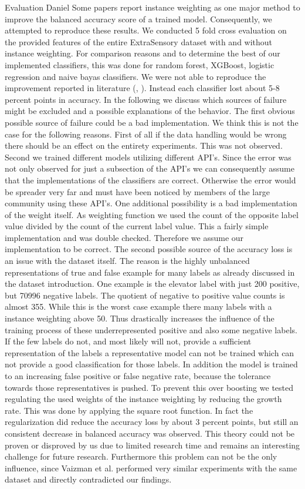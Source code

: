 \begin{section}{Evaluation Daniel}
	Some papers report instance weighting as one major method to improve the balanced accuracy score of a trained model. Consequently, we attempted to reproduce these results. We conducted 5 fold cross evaluation on the provided features of the entire ExtraSensory dataset with and without instance weighting. For comparison reasons and to determine the best of our implemented classifiers, this was done for random forest, XGBoost, logistic regression and naive bayas classifiers. 
	We were not able to reproduce the improvement reported in literature (\cite{Vaizman18}, \cite{Saeed18}). Instead each classifier lost about 5-8 percent points in accuracy. In the following we discuss which sources of failure might be excluded and a possible explanations of the behavior. 
	The first obvious possible source of failure could be a bad implementation. We think this is not the case for the following reasons. First of all if the data handling would be wrong there should be an effect on the entirety experiments. This was not observed. Second we trained different models utilizing different API's. Since the error was not only observed for just a subsection of the API's we can consequently assume that the implementations of the classifiers are correct. Otherwise the error would be spreader very far and must have been noticed by members of the large community using these API's. One additional possibility is a bad implementation of the weight itself. As weighting function we used the count of the opposite label value divided by the count of the current label value. This a fairly simple implementation and was double checked. Therefore we assume our implementation to be correct. 
	The second possible source of the accuracy loss is an issue with the dataset itself. The reason is the highly unbalanced representations of true and false example for many labels as already discussed in the dataset introduction. One example is the elevator label with just 200 positive, but 70996 negative labels. The quotient of negative to positive value counts is almost 355. While this is the worst case example there many labels with a instance weighting above 50. Thus drastically increases the influence of the training process of these underrepresented positive and also some negative labels. If the few labels do not, and most likely will not, provide a sufficient representation of the labels a representative model can not be trained which can not provide a good classification for those labels. In addition the model is trained to an increasing false positive or false negative rate, because the tolerance towards those representatives is pushed.
	To prevent this over boosting we tested regulating the used weights of the instance weighting by reducing the growth rate. This was done by applying the square root function. In fact the regularization did reduce the accuracy loss by about 3 percent points, but still an consistent decrease in balanced accuracy was observed. This theory could not be proven or disproved by us due to limited research time and remains an interesting challenge for future research. Furthermore this problem can not be the only influence, since Vaizman et al. performed very similar experiments with the same dataset and directly contradicted our findings.
	

\end{section}
